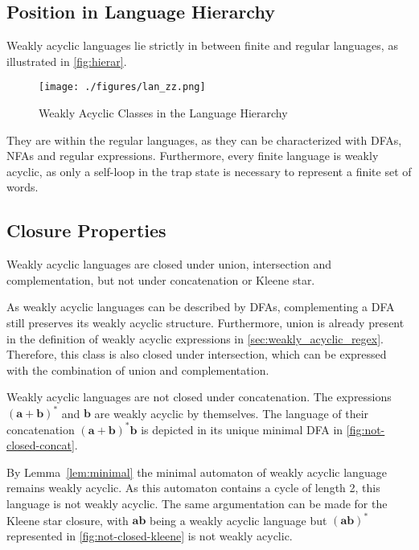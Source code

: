 \subsection{Position in Language Hierarchy}
Weakly acyclic languages lie strictly in between finite and regular languages, as illustrated in \autoref{fig:hierar}.

\begin{figure}[H]
\centering 
\texttt{[image: ./figures/lan\_zz.png]}
\caption{Weakly Acyclic Classes in the Language Hierarchy}\label{fig:hierar}
\end{figure}


They are within the regular languages, as they can be characterized with DFAs, NFAs and regular expressions. Furthermore, every finite language is weakly acyclic, as only a self-loop in the trap state is necessary to represent a finite set of words.

\subsection{Closure Properties}
Weakly acyclic languages are closed under union, intersection and complementation, but not under concatenation or Kleene star. 
\par 
As weakly acyclic languages can be described by DFAs, complementing a DFA still preserves its weakly acyclic structure. Furthermore, union is already present in the definition of weakly acyclic expressions in \autoref{sec:weakly_acyclic_regex}. Therefore, this class is also closed under intersection, which can be expressed with the combination of union and complementation. 
\par
Weakly acyclic languages are not closed under concatenation. The expressions $\bm{(a + b)^{*}}$ and $\bm{b}$ are weakly acyclic by themselves. The language of their concatenation $\bm{(a + b)^{*}b}$ is depicted in its unique minimal DFA in \autoref{fig:not-closed-concat}.

By Lemma~\autoref{lem:minimal} the minimal automaton of weakly acyclic language remains weakly acyclic. As this automaton contains a cycle of length 2, this language is not weakly acyclic. The same argumentation can be made for the Kleene star closure, with $\bm{ab}$ being a weakly acyclic language but $\bm{(ab)^{*}}$ represented in \autoref{fig:not-closed-kleene} is not weakly acyclic. 

